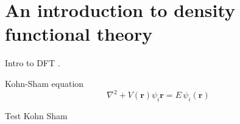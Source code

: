 \chapter{An introduction to density functional theory}

Intro to DFT \cite{Kohn1965}.

Kohn-Sham equation 
\begin{equation}
\nabla^2 + V(\mathbf{r}) \psi_{i}\mathbf{r} = E\,\psi_{i}(\mathbf{r})
\end{equation}


\begin{thebibliography}{99.}%
 Test Kohn Sham
\end{thebibliography}